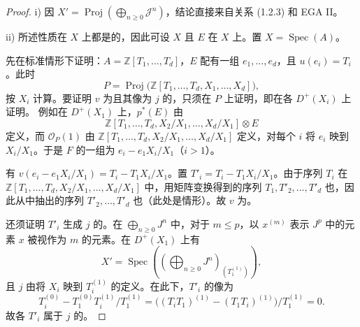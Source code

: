 \begin{proof}
 i) 因 $X'=\operatorname{Proj}(\bigoplus_{n\geq0}\mathcal J^n)$，结论直接来自关系 (1.2.3) 和 EGA II。

 ii) 所述性质在 $X$ 上都是的，因此可设 $X$ 且 $E$ 在 $X$ 上。置 $X=\operatorname{Spec}(A)$。

先在标准情形下证明：$A=\mathbb Z[T_1,\ldots,T_d]$，$E$ 配有一组 $e_1,\ldots,e_d$，且 $u(e_i)=T_i$。此时
\[
P=\operatorname{Proj}\bigl(\mathbb Z[T_1,\ldots,T_d,X_1,\ldots,X_d]\bigr),
\]
按 $X_i$ 计算。要证明 $v$ 为且其像为 $j$ 的，只须在 $P$ 上证明，即在各 $D^+(X_i)$ 上证明。
例如在 $D^+(X_1)$ 上，$p^*(E)$ 由
\[
\mathbb Z[T_1,\ldots,T_d,X_2/X_1,\ldots,X_d/X_1]\otimes E
\]
定义，而 $\mathcal O_P(1)$ 由 $\mathbb Z[T_1,\ldots,T_d,X_2/X_1,\ldots,X_d/X_1]$ 定义，对每个 $i$ 将 $e_i$ 映到 $X_i/X_1$。于是 $F$ 的一组为 $e_i-e_1X_i/X_1$（$i>1$）。

有 $v(e_i-e_1X_i/X_1)=T_i-T_1X_i/X_1$。置 $T'_i=T_i-T_1X_i/X_1$。由于序列 $T_i$ 在 $\mathbb Z[T_1,\ldots,T_d,X_2/X_1,\ldots,X_d/X_1]$ 中，用矩阵变换得到的序列 $T_1,T'_2,\ldots,T'_d$ 也，因此从中抽出的序列 $T'_2,\ldots,T'_d$ 也（此处是情形）。故 $v$ 为。

还须证明 $T'_i$ 生成 $j$ 的。在 $\bigoplus_{n\geq0}J^n$ 中，对于 $m\leq p$，以 $x^{(m)}$ 表示 $J^p$ 中的元素 $x$ 被视作为 $m$ 的元素。在 $D^+(X_1)$ 上有
\[
X'=\operatorname{Spec}\left(\left(\bigoplus_{n\geq0}J^n\right)_{(T_1^{(1)})}\right),
\]
且 $j$ 由将 $X_i$ 映到 $T_i^{(1)}$ 的定义。在此下，$T'_i$ 的像为
\[
T_i^{(0)}-T_1^{(0)}T_i^{(1)}/T_1^{(1)}
=\bigl((T_iT_1)^{(1)}-(T_1T_i)^{(1)}\bigr)/T_1^{(1)}=0.
\]
故各 $T'_i$ 属于 $j$ 的。


\end{proof}
